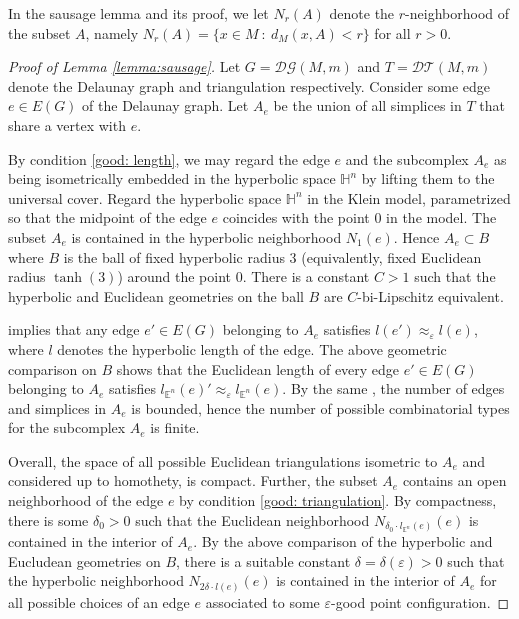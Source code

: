 \documentclass{amsart}
\newcommand{\HH}{\mathbb{H}}
\newcommand{\EE}{\mathbb{E}}
\newcommand{\DelanGraph}{\mathcal{DG}}
\newcommand{\DelanComplex}{\mathcal{DT}}
\theoremstyle{plain}
\numberwithin{equation}{section}
\theoremstyle{definition}
\begin{document}
In the sausage lemma and its proof, we let $N_r(A)$ denote the $r$-neighborhood of the subset $A$, namely $N_r(A) = \{x \in M \: : \: d_M(x,A) < r\}$ for all  $r > 0$.

\begin{proof}[Proof of Lemma \ref{lemma:sausage}]
Let $G = \DelanGraph(M,m)$ and $T=\DelanComplex(M,m)$ denote  the Delaunay graph and triangulation respectively.
Consider some edge $e \in E(G)$ of the Delaunay graph. Let $A_e$ be the  union of all simplices in $T$ that share a vertex with $e$. 

By condition \ref{good: length}, we may regard  the edge $e$ and the subcomplex  $A_e$ as being isometrically embedded in the hyperbolic space  $\HH^n$ by lifting them to the universal cover. Regard the hyperbolic space  $\HH^n$ in the Klein model, parametrized so that the  midpoint of the edge $e$ coincides with the point $0$ in the model. The subset $A_e$ is contained in the hyperbolic neighborhood $N_1(e)$. Hence $A_e \subset B$ where $B$ is the ball of fixed hyperbolic radius $3$ (equivalently, fixed Euclidean radius $\tanh (3)$) around the point $0$. There is a constant $C > 1$ such that the hyperbolic and Euclidean geometries on the ball $B$ are $C$-bi-Lipschitz equivalent. 


 implies that any edge $e' \in E(G)$ belonging to $A_e$ satisfies $l(e') \approx_\varepsilon l(e)$, where $l$ denotes the hyperbolic length of the edge. The above geometric comparison on $B$ shows that the Euclidean length of every edge $e' \in E(G)$ belonging to $A_e$ satisfies 
$
    \label{eq: bilip condition} l_{\mathbb{E}^n}(e)' \approx_\varepsilon l_{\mathbb{E}^n}(e).
$
By the same , the number of edges and simplices in $A_e$ is bounded, hence the number of possible combinatorial types for the subcomplex $A_e$ is finite. 

Overall, the space of all possible Euclidean triangulations isometric to $A_e$ and considered up to homothety, is compact. Further, the subset $A_e$ contains an open neighborhood of the edge $e$ by condition \ref{good: triangulation}. 
By compactness, there is some $\delta_0 > 0$ such that the Euclidean neighborhood $N_{\delta_0 \cdot l_{\EE^n}(e)}(e)$ is contained in the interior of  $A_e$. 
By the above comparison of the hyperbolic and Eucludean geometries on $B$, there is a suitable constant $\delta = \delta(\varepsilon)> 0$ such that the hyperbolic neighborhood $N_{2\delta \cdot l(e)}(e)$ is contained in the interior of $A_e$ for all possible choices of an edge $e$ associated to some $\varepsilon$-good point configuration.


\end{proof}
\end{document}
